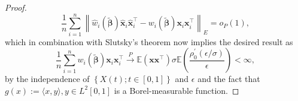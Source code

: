 \documentclass[11pt]{article}
\begin{document}
\begin{proof}
\begin{equation*}
\frac{1}{n} \sum_{i=1}^n \left\| \widehat{w}_i ( \boldsymbol{\widetilde{\beta}} ) \mathbf{\widehat{x}}_i \mathbf{\widehat{x}}_i^{\top} - w_i ( \boldsymbol{\widetilde{\beta}} ) \mathbf{x}_i \mathbf{x}_i^{\top}  \right\|_{E} = o_{P}(1),
\end{equation*}
which in combination with Slutsky's theorem now implies the desired result as
\begin{equation}
\frac{1}{n}\sum_{i=1}^n w_i ( \boldsymbol{\widetilde{\beta}} ) \mathbf{x}_i \mathbf{x}_i^{\top} \xrightarrow{P} \mathbb{E} ( \mathbf{x}\mathbf{x}^{\top} ) \sigma \mathbb{E} \left( \frac{ \rho_0^{\prime} (\epsilon/ \sigma)}{\epsilon} \right)< \infty,
\end{equation}
by the independence of $\left\{X(t); t\in [0,1] \right\}$ and $\epsilon$ and the fact that $g(x):= \langle x, y  \rangle, y \in L^2[0,1] $ is a Borel-measurable function.


\end{proof}
\end{document}
